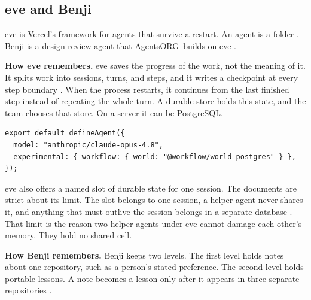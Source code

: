 \documentclass[11pt,a4paper]{article}
\newcommand{\aorg}{\href{https://agents.org.in}{AgentsORG}}
\begin{document}
\subsection{eve and Benji}
\label{sec:eve}

eve is Vercel's framework for agents that survive a restart. An agent is
a folder \cite{eveSite}. Benji is a design-review agent that \aorg\
builds on eve \cite{benjiRepo,agentsorg}.

\textbf{How eve remembers.} eve saves the progress of the work, not the
meaning of it. It splits work into sessions, turns, and steps, and it
writes a checkpoint at every step boundary \cite{eveDurability}. When the
process restarts, it continues from the last finished step instead of
repeating the whole turn. A durable store holds this state, and the team
chooses that store. On a server it can be PostgreSQL.

\begin{lstlisting}[style=ts,caption={Choosing PostgreSQL as the durable store in eve \cite{eveDurability}.}]
export default defineAgent({
  model: "anthropic/claude-opus-4.8",
  experimental: { workflow: { world: "@workflow/world-postgres" } },
});
\end{lstlisting}

eve also offers a named slot of durable state for one session. The
documents are strict about its limit. The slot belongs to one session, a
helper agent never shares it, and anything that must outlive the session
belongs in a separate database \cite{eveState}. That limit is the reason
two helper agents under eve cannot damage each other's memory. They hold
no shared cell.

\textbf{How Benji remembers.} Benji keeps two levels. The first level
holds notes about one repository, such as a person's stated preference.
The second level holds portable lessons. A note becomes a lesson only
after it appears in three separate repositories \cite{benjiRepo}.
\end{document}
